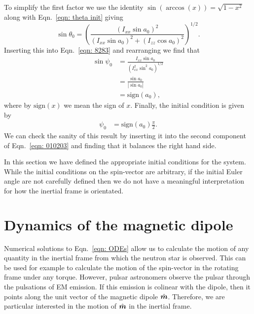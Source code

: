 \documentclass[../full_thesis/full_thesis.tex]{subfiles}
\begin{document}
To simplify the first factor we use the identity $\sin(\arccos(x)) = \sqrt{1 - x^{2}}$
along with Eqn.~\eqref{eqn:  theta init} giving
\begin{equation}
\sin\theta_{0} = \left(\frac{(I_{xx}\sin a_{0})^{2}}
                  {(I_{xx}\sin a_{0})^{2} + (I_{zz}\cos a_{0})^{2}} \right)^{1/2}.
\end{equation}
Inserting this into Eqn.~\eqref{eqn: 8283} and rearranging we find that
\begin{align}
\sin \psi_0 & = \frac{I_{xx} \sin a_{0}}{\left(I_{xx}^{2} \sin^{2} a_{0}\right)^{1/2}} \\
 & = \frac{\sin a_{0} }{|\sin a_{0}|} \\
& = \mathrm{sign}(a_{0}),
\end{align}
where by $\mathrm{sign}(x)$ we mean the sign of $x$. Finally, the initial
condition is given by
\begin{align}
\psi_{0} & =\mathrm{sign}(a_{0}) \frac{\pi}{2}.
\label{eqn: psi  init}
\end{align}
We can check the sanity of this result by inserting it into the second component of
Eqn.~\eqref{eqn: 010203} and finding that it balances the right hand side.

In this section we have defined the appropriate initial conditions for the system.
While the initial conditions on the spin-vector are arbitrary, if the initial
Euler angle are not carefully defined then we do not have a meaningful interpretation
for how the inertial frame is orientated.

\section{Dynamics of the magnetic dipole}

Numerical solutions to Eqn.~\eqref{eqn: ODEs} allow us to calculate the motion
of any quantity in the inertial frame from which the neutron star is observed.
This can be used for example to calculate the motion of the spin-vector in the
rotating frame under any torque. However, pulsar astronomers observe the pulsar
through the pulsations of EM emission. If this emission is colinear with the
dipole, then it points along the unit vector of the magnetic dipole $\hat{\boldsymbol{m}}$. Therefore,
we are particular interested in the motion of $\hat{\boldsymbol{m}}$ in the inertial frame.
\end{document}

